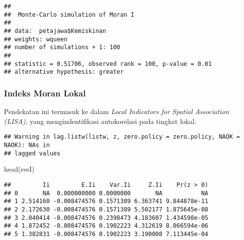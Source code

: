 \documentclass[
]{book}
\newenvironment{Shaded}{\begin{snugshade}}{\end{snugshade}}
\newcommand{\FunctionTok}[1]{\textcolor[rgb]{0.00,0.00,0.00}{#1}}
\newcommand{\NormalTok}[1]{#1}
\newcommand{\OtherTok}[1]{\textcolor[rgb]{0.56,0.35,0.01}{#1}}
\newcommand{\SpecialCharTok}[1]{\textcolor[rgb]{0.00,0.00,0.00}{#1}}
\begin{document}
\begin{verbatim}
## 
##  Monte-Carlo simulation of Moran I
## 
## data:  petajawa$Kemiskinan 
## weights: wqueen  
## number of simulations + 1: 100 
## 
## statistic = 0.51706, observed rank = 100, p-value = 0.01
## alternative hypothesis: greater
\end{verbatim}

\hypertarget{indeks-moran-lokal}{%
\subsubsection{Indeks Moran Lokal}\label{indeks-moran-lokal}}

Pendekatan ini termasuk ke dalam \emph{Local Indicators for Spatial Association (LISA)}, yang mengindentifikasi autokorelasi pada tingkat lokal.

\begin{Shaded}
\end{Shaded}

\begin{verbatim}
## Warning in lag.listw(listw, z, zero.policy = zero.policy, NAOK = NAOK): NAs in
## lagged values
\end{verbatim}

\begin{Shaded}
\begin{Highlighting}[]
\FunctionTok{head}\NormalTok{(resI)}
\end{Highlighting}
\end{Shaded}

\begin{verbatim}
##         Ii         E.Ii    Var.Ii     Z.Ii    Pr(z > 0)
## 0       NA  0.000000000 0.0000000       NA           NA
## 1 2.514160 -0.008474576 0.1571389 6.363741 9.844878e-11
## 2 2.172630 -0.008474576 0.1571389 5.502177 1.875645e-08
## 3 2.040414 -0.008474576 0.2398473 4.183607 1.434598e-05
## 4 1.872452 -0.008474576 0.1902223 4.312619 8.066594e-06
## 5 1.382831 -0.008474576 0.1902223 3.190008 7.113445e-04
\end{verbatim}
\end{document}
